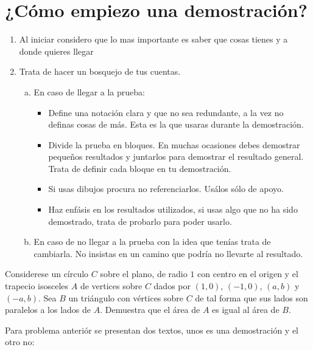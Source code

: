 \chapter*{¿Cómo empiezo una demostración?}

\begin{enumerate}
  \item Al iniciar considero que lo mas importante es
    saber que cosas tienes y a donde quieres llegar
  \item Trata de hacer un bosquejo de tus cuentas.

  \begin{enumerate}[a)]
    \item En caso de llegar a la prueba:\
    \begin{itemize}
      \item Define una notación clara y que no sea redundante,
        a la vez no definas cosas de más.
        Esta es la que usaras durante la demostración.\
      \item Divide la prueba en bloques.
        En muchas ocasiones debes demostrar pequeños resultados
        y juntarlos para demostrar el resultado general.
        Trata de definir cada bloque en tu demostración.
      \item Si usas dibujos procura no referenciarlos.
        Usálos sólo de apoyo.
      \item Haz enfásis en los resultados utilizados, si usas algo que no ha sido demostrado, trata de probarlo para poder usarlo.
    \end{itemize}

    \item En caso de no llegar a la prueba con la idea que tenías trata de cambiarla. No insistas en un camino que podría no llevarte al resultado.
  \end{enumerate}

\end{enumerate}

  \begin{exmp}
    Considerese un círculo $C$ sobre el plano,
    de radio $1$ con centro en el origen
    y el trapecio isosceles $A$ de vertices sobre $C$
    dados por $(1,0)$, $(-1,0)$, $(a,b)$ y $(-a,b)$.
    Sea $B$ un triángulo con vértices sobre $C$
    de tal forma que sus lados son paralelos a los lados de $A$.
    Demuestra que el área de $A$ es igual al área de $B.$
  \end{exmp}

Para problema anteriór se presentan dos textos, unos es una demostración y el otro no:

